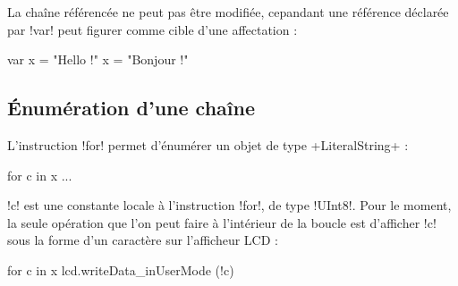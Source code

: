 La chaîne référencée ne peut pas être modifiée, cepandant une référence déclarée par \plm!var! peut figurer comme cible d'une affectation :
\begin{PLM}
var x = "Hello !"
x = "Bonjour !"
\end{PLM}
 
\subsection{Énumération d'une chaîne}

L'instruction \plm!for! permet d'énumérer un objet de type \plm+LiteralString+ :
\begin{PLM}
for c in x {
  ...
}
\end{PLM}

\plm!c! est une constante locale à l'instruction \plm!for!, de type \plm!UInt8!. Pour le moment, la seule opération que l'on peut faire à l'intérieur de la boucle est d'afficher \plm!c! sous la forme d'un caractère sur l'afficheur LCD :
\begin{PLM}
for c in x {
  lcd.writeData_inUserMode (!c)
}
\end{PLM}


